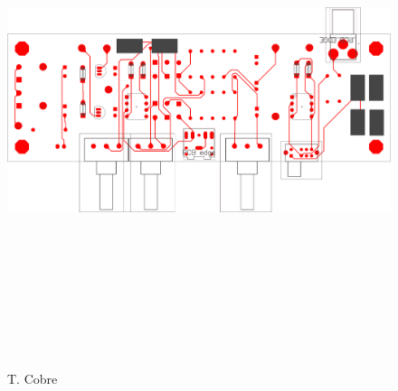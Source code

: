 \begin{figure}[H]
    \centering
    \includegraphics[height=150mm, angle=90]{img/PCB/layers/preamp/top-copper.png}
    \caption{\footnotesize{ T. Cobre}}
    \label{fig:pcb_preamp_top_copper}
\end{figure}

\clearpage

